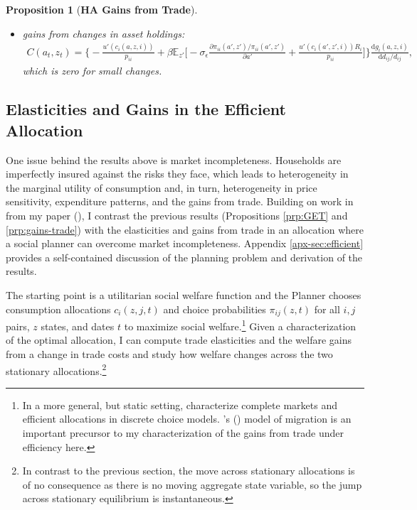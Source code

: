 \documentclass[12pt,pdftex]{article}
\newtheorem{prp}{Proposition}
\def\citeapos#1{\citeauthor{#1}'s (\citeyear{#1})}
\begin{document}
\begin{onehalfspacing}
\begin{prp}[\textbf{HA Gains from Trade}]
\begin{itemize}
\item gains from changes in asset holdings:
{\footnotesize
\begin{align}
\nonumber
C(a_{t},z_{t}) = \bigg \{- \frac{u'(c_{i}(a,z,i))}{p_{ii}} + \beta \mathbb{E}_{z'} \bigg [-\sigma_{\epsilon} \frac{\partial \pi_{ii}(a',z') / \pi_{ii}(a',z')}{\partial a'} + \frac{u'(c_{i}(a',z',i))R_{i}}{p_{ii}} \bigg ] \bigg \}\frac{\mathrm{d} g_{i}(a,z,i)}{\mathrm{d} d_{ij} / d_{ij}},
\end{align}}
which is zero for small changes.
\end{itemize}
\end{prp}

\subsection{Elasticities and Gains in the Efficient Allocation}\label{sec:efficient}

One issue behind the results above is market incompleteness. Households are imperfectly insured against the risks they face, which leads to heterogeneity in the marginal utility of consumption and, in turn, heterogeneity in price sensitivity, expenditure patterns, and the gains from trade. Building on work in from my paper (\citet{waughoptimal}), I contrast the previous results (Propositions \ref{prp:GET} and \ref{prp:gains-trade}) with the elasticities and gains from trade in an allocation where a social planner can overcome market incompleteness. Appendix \ref{apx-sec:efficient} provides a self-contained discussion of the planning problem and derivation of the results.

The starting point is a utilitarian social welfare function and the Planner chooses consumption allocations $c_{i}(z, j, t)$ and choice probabilities $\pi_{ij}(z,t)$ for all $i,j$ pairs, $z$ states, and dates $t$ to maximize social welfare.\footnote{In a more general, but static setting, \citet{mongey-waugh-2} characterize complete markets and efficient allocations in discrete choice models. \citeapos{lagakos2023welfare} model of migration is an important precursor to my characterization of the gains from trade under efficiency here.} Given a characterization of the optimal allocation, I can compute trade elasticities and the welfare gains from a change in trade costs and study how welfare changes across the two stationary allocations.\footnote{In contrast to the previous section, the move across stationary allocations is of no consequence as there is no moving aggregate state variable, so the jump across stationary equilibrium is instantaneous.}


\end{onehalfspacing}
\end{document}
